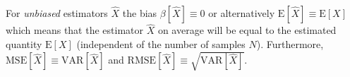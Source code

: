 \documentclass[10pt,a4paper]{article}
\numberwithin{equation}{section}
\begin{document}
For \textit{unbiased} estimators $\widehat{X}$ the bias $\beta\left[\widehat{X}\right] \equiv 0$ or alternatively $\mathrm{E}\left[\widehat{X}\right] \equiv \mathrm{E}\left[X\right]$ which means that the estimator $\widehat{X}$ on average will be equal to the estimated quantity $\mathrm{E}\left[X\right]$ (independent of the number of samples $N$). Furthermore, $\mathrm{MSE}\left[\widehat{X}\right] \equiv \mathrm{VAR}\left[\widehat{X}\right]$ and $\mathrm{RMSE}\left[\widehat{X}\right] \equiv \sqrt{\mathrm{VAR}\left[\widehat{X}\right]}$.
\end{document}
